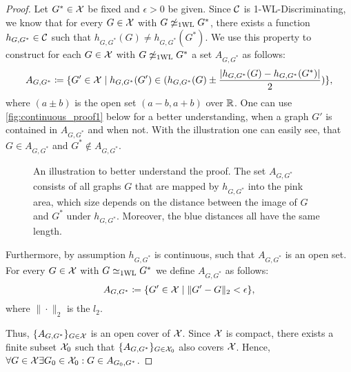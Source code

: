\begin{proof}
    Let $G^* \in \mathcal{X}$ be fixed and $\epsilon > 0$ be given. Since $\mathcal{C}$ is 1-\!WL-Discriminating, we know that for every $G \in \mathcal{X}$ with $G \not\simeq_{\text{1WL}} G^*$, there exists a function $h_{G, G^*} \in \mathcal{C}$ such that $h_{G, G^*}(G) \neq h_{G, G^*}(G^*)$. We use this property to construct for each $G \in \mathcal{X}$ with $G \not\simeq_{\text{1WL}} G^*$ a set $A_{G, G^*}$ as follows:
    \begin{equation*}
        A_{G, G^*} \coloneqq \{ G' \in \mathcal{X} \mid h_{G, G^*}(G') \in (h_{G, G^*}(G) \pm \frac{|h_{G, G^*}(G) - h_{G, G^*}(G^*)|}{2})\},
    \end{equation*}
    where $(a \pm b)$ is the open set $(a-b, a+b)$ over $\mathbb{R}$.
    One can use \autoref{fig:continuous_proof1} below for a better understanding, when a graph $G'$ is contained in $A_{G, G^*}$ and when not. With the illustration one can easily see, that $G \in A_{G, G^*}$ and $G^* \not\in A_{G, G^*}$.

    \begin{figure}[H]
        \centering
        
        \caption{An illustration to better understand the proof. The set $A_{G, G^*}$ consists of all graphs $G$ that are mapped by $h_{G, G^*}$ into the pink area, which size depends on the distance between the image of $G$ and $G^*$ under $h_{G, G^*}$. Moreover, the blue distances all have the same length.}
        \label{fig:continuous_proof1}
    \end{figure}

   Furthermore, by assumption $h_{G, G^*}$ is continuous, such that $A_{G, G^*}$ is an open set. For every $G \in \mathcal{X}$ with $G \simeq_{\text{1WL}} G^*$ we define $A_{G, G^*}$ as follows:
    \begin{equation*}
        A_{G, G^*} \coloneqq \{ G' \in \mathcal{X} \mid \| G' - G \|_2 < \epsilon\},
    \end{equation*}
    where $\|\cdot\|_2$ is the $l_2$.

    Thus, $\{ A_{G, G^*} \}_{G \in \mathcal{X}}$ is an open cover of $\mathcal{X}$. Since $\mathcal{X}$ is compact, there exists a finite subset $\mathcal{X}_0$ such that $\{ A_{G, G^*} \}_{G \in \mathcal{X}_0}$ also covers $\mathcal{X}$. Hence, $\forall G \in \mathcal{X} \exists G_0 \in \mathcal{X}_0: G \in A_{G_0, G^*}$.



\end{proof}
